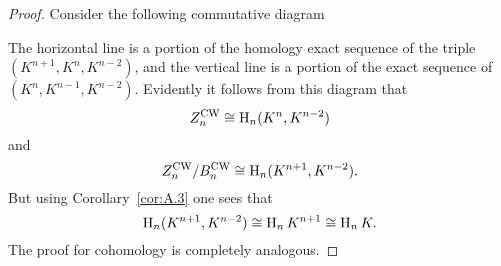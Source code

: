 \documentclass[../main]{subfiles}
\begin{document}
\begin{proof}
Consider the following commutative diagram

\begin{center}
\end{center}

The horizontal line is a portion of the homology exact sequence of the triple $(K^{n+1}, K^n, K^{n-2})$, and the vertical line is a portion of the exact sequence of $(K^n, K^{n-1}, K^{n-2})$. Evidently it follows from this diagram that \[Z^{\mathrm{CW}}_n \cong \operatorname{H}_n (K^n, K^{n-2})\] and \[Z^{\mathrm{CW}}_n / B^{\mathrm{CW}}_n \cong \operatorname{H}_n (K^{n+1}, K^{n-2}).\]
But using Corollary~\ref{cor:A.3} one sees that \[\operatorname{H}_n (K^{n+1}, K^{n-2}) \cong \operatorname{H}_n K^{n+1} \cong \operatorname{H}_n K.\]
The proof for cohomology is completely analogous.
\end{proof}
\end{document}
